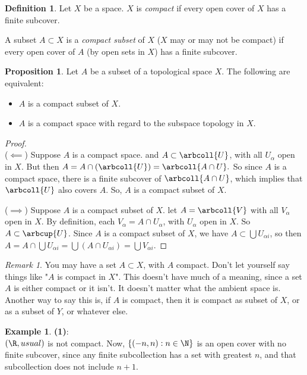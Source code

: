 \documentclass[a5paper]{article}
\theoremstyle{definition}%
\newtheorem*{proposition*}{Proposition}
\newtheorem*{definition*}{Definition}
\newtheorem*{example*}{Example}
\numberwithin{exercise}{section}
\theoremstyle{remark}%
\newtheorem*{remark*}{Remark}
\begin{document}
\begin{highlight}
\begin{definition*}
Let $X$ be a space. $X$ is \emph{compact} if every open cover of $X$ has a finite subcover. 

A subset $A\subset	X$ is a \emph{compact subset} of $X$ ($X$ may or may not be compact) if every open cover of $A$ (by open sets in $X$) has a finite subcover. 
\end{definition*}
\end{highlight}

\begin{proposition*}
Let $A$ be a subset of a topological space $X$. The following are equivalent:
\begin{itemize}
	\item $A$ is a compact subset of $X$. 
	\item $A$ is a compact space with regard to the subspace topology in $X$. 
\end{itemize}
\end{proposition*}
\begin{proof}\mbox{}\\
($\impliedby$) Suppose $A$ is a compact space. and $A\subset \arbcoll{U}$, with all $U_\alpha$ open in $X$. But then 
$A=A\cap(\arbcoll{U})=\arbcoll{A\cap U}.$
So since $A$ is a compact space, there is a finite subcover of $\arbcoll{A\cap U}$, which implies that $\arbcoll{U}$ also covers $A$. So, $A$ is a compact subset of $X$.

\noindent ($\implies$) Suppose $A$ is a compact subset of $X$. let $A=\arbcoll{V}$ with all $V_\alpha$ open in $X$. By definition, each $V_\alpha=A\cap U_\alpha$, with $U_\alpha$ open in $X$. So $A\subset \arbcup{U}$. Since $A$ is a compact subset of $X$, we have $A\subset \bigcup U_{\alpha i}$, so then $A=A\cap \bigcup U_{\alpha i}=\bigcup(A\cap U_{\alpha i})=\bigcup V_{\alpha i}$. 
\end{proof}

\begin{remark*}
You may have a set $A\subset X$, with $A$ compact. Don't let yourself say things like "$A$ is compact in $X$". This doesn't have much of a meaning, since a set $A$ is either compact or it isn't. It doesn't matter what the ambient space is. Another way to say this is, if $A$ is compact, then it is compact as subset of $X$, or as a subset of $Y$, or whatever else.
\end{remark*}

\begin{example*}\textbf{(1)}:\\
$(\R,usual)$ is not compact. Now, $\{(-n,n):n\in \N\}$ is an open cover with no finite subcover, since any finite subcollection has a set with greatest $n$, and that subcollection does not include $n+1$. 
\end{example*}
\end{document}
